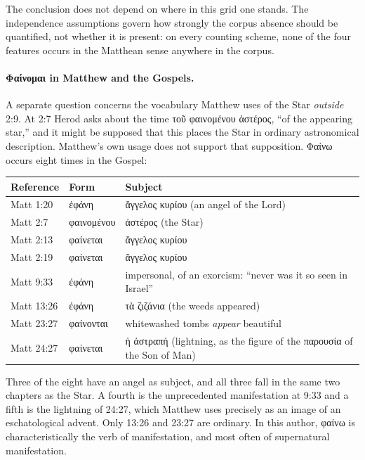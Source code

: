 \documentclass[11pt,a4paper]{article}
\newcommand{\grk}[1]{{\fontencoding{LGR}\selectfont #1}}
\newcommand{\grk}[1]{{\greekfont #1}}
\begin{document}
The conclusion does not depend on where in this grid one stands. The
independence assumptions govern how strongly the corpus absence should be
quantified, not whether it is present: on every counting scheme, none of the
four features occurs in the Matthean sense anywhere in the corpus.

\paragraph{\grk{Φαίνομαι} in Matthew and the Gospels.}

A separate question concerns the vocabulary Matthew uses of the Star
\emph{outside} 2:9. At 2:7 Herod asks about the time \grk{τοῦ φαινομένου
ἀστέρος}, ``of the appearing star,'' and it might be supposed that this places
the Star in ordinary astronomical description. Matthew's own usage does not
support that supposition. \grk{Φαίνω} occurs eight times in the Gospel:

\begin{center}
\begin{tabular}{@{}llp{6.4cm}@{}}
\toprule
Reference & Form & Subject \\
\midrule
Matt 1:20  & \grk{ἐφάνη}     & \grk{ἄγγελος κυρίου} (an angel of the Lord) \\
Matt 2:7   & \grk{φαινομένου}& \grk{ἀστέρος} (the Star) \\
Matt 2:13  & \grk{φαίνεται}  & \grk{ἄγγελος κυρίου} \\
Matt 2:19  & \grk{φαίνεται}  & \grk{ἄγγελος κυρίου} \\
Matt 9:33  & \grk{ἐφάνη}     & impersonal, of an exorcism: ``never was it so seen in Israel'' \\
Matt 13:26 & \grk{ἐφάνη}     & \grk{τὰ ζιζάνια} (the weeds appeared) \\
Matt 23:27 & \grk{φαίνονται} & whitewashed tombs \emph{appear} beautiful \\
Matt 24:27 & \grk{φαίνεται}  & \grk{ἡ ἀστραπή} (lightning, as the figure of the \grk{παρουσία} of the Son of Man) \\
\bottomrule
\end{tabular}
\end{center}

Three of the eight have an angel as subject, and all three fall in the same two
chapters as the Star. A fourth is the unprecedented manifestation at 9:33 and a
fifth is the lightning of 24:27, which Matthew uses precisely as an image of an
eschatological advent. Only 13:26 and 23:27 are ordinary. In this author,
\grk{φαίνω} is characteristically the verb of manifestation, and most often of
supernatural manifestation.
\end{document}
